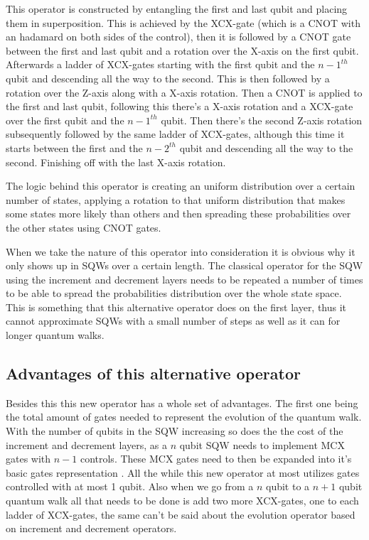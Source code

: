 This operator is constructed by entangling the first and last qubit and placing them in superposition. This is achieved by the XCX-gate (which is a CNOT with an hadamard on both sides of the control), then it is followed by a CNOT gate between the first and last qubit and a rotation over the X-axis on the first qubit. Afterwards a ladder of XCX-gates starting with the first qubit and the $n-1^{th}$ qubit and descending all the way to the second. This is then followed by a rotation over the Z-axis along with a X-axis rotation. Then a CNOT is applied to the first and last qubit, following this there's a X-axis rotation and a XCX-gate over the first qubit and the $n-1^{th}$ qubit. Then there's the second Z-axis rotation subsequently followed by the same ladder of XCX-gates, although this time it starts between the first and the $n-2^{th}$ qubit and descending all the way to the second. Finishing off with the last X-axis rotation.

The logic behind this operator is creating an uniform distribution over a certain number of states, applying a rotation to that uniform distribution that makes some states more likely than others and then spreading these probabilities over the other states using CNOT gates.

When we take the nature of this operator into consideration it is obvious why it only shows up in SQWs over a certain length. The classical operator for the SQW using the increment and decrement layers needs to be repeated a number of times to be able to spread the probabilities distribution over the whole state space. This is something that this alternative operator does on the first layer, thus it cannot approximate SQWs with a small number of steps as well as it can for longer quantum walks.

\subsection{Advantages of this alternative operator}

Besides this this new operator has a whole set of advantages. The first one being the total amount of gates needed to represent the evolution of the quantum walk. With the number of qubits in the SQW increasing so does the the cost of the increment and decrement layers, as a $n$ qubit SQW needs to implement MCX gates with $n-1$ controls. These MCX gates need to then be expanded into it's basic gates representation \cite{gate-decomp}. All the while this new operator at most utilizes gates controlled with at most 1 qubit. Also when we go from a $n$ qubit to a $n+1$ qubit quantum walk all that needs to be done is add two more XCX-gates, one to each ladder of XCX-gates, the same can't be said about the evolution operator based on increment and decrement operators. 

